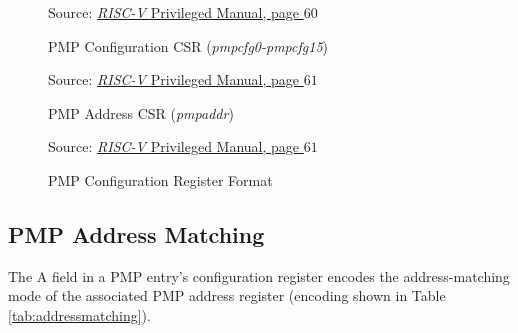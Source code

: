 \begin{figure}[htbp]
  \centering
  \def\stackalignment{r}
  {\scriptsize Source: \href{https://drive.google.com/file/d/17GeetSnT5wW3xNuAHI95-SI1gPGd5sJ_/view}{\textit{RISC-V} Privileged Manual, page $60$}}
  \caption{PMP Configuration CSR (\textit{pmpcfg0-pmpcfg15})}
  \label{fig:pmpcfgs}
\end{figure}

\begin{figure}[htbp]
  \centering
  \def\stackalignment{r} %
  {\scriptsize Source: \href{https://drive.google.com/file/d/17GeetSnT5wW3xNuAHI95-SI1gPGd5sJ_/view}{\textit{RISC-V} Privileged Manual, page $61$}}
  \caption{PMP Address CSR (\textit{pmpaddr})}
  \label{fig:pmpaddr}
\end{figure}

\begin{figure}[htbp]
  \centering
  \def\stackalignment{r} %
  {\scriptsize Source: \href{https://drive.google.com/file/d/17GeetSnT5wW3xNuAHI95-SI1gPGd5sJ_/view}{\textit{RISC-V} Privileged Manual, page $61$}}
  \caption{PMP Configuration Register Format}
  \label{fig:pmpconf}
\end{figure}

\subsection{PMP Address Matching}
\label{subsec:pmpaddressmatching}

The A field in a PMP entry's configuration register encodes the address-matching
mode of the associated PMP address register (encoding shown in Table
\ref{tab:addressmatching}).

